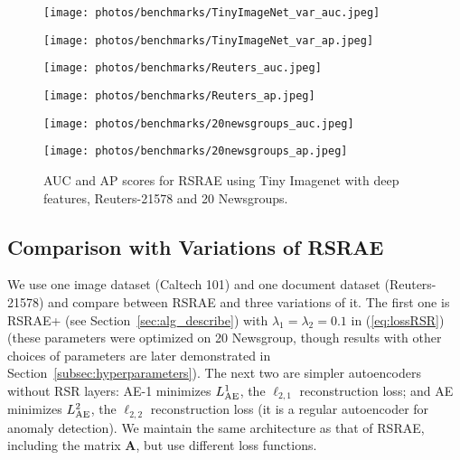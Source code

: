 \documentclass{article} \usepackage{iclr2020_conference,times}
\def\Secref#1{Section~\ref{#1}}
\def\eqref#1{(\ref{#1})}
\def\rmA{{\mathbf{A}}}
\begin{document}
\begin{figure}[htb]


\centering
\begin{minipage}[t]{0.48\textwidth}
\centering
\texttt{[image: photos/benchmarks/TinyImageNet\_var\_auc.jpeg]}
\end{minipage}
\begin{minipage}[t]{0.48\textwidth}
\centering
\texttt{[image: photos/benchmarks/TinyImageNet\_var\_ap.jpeg]}
\end{minipage}


 
\centering
\begin{minipage}[t]{0.48\textwidth}
\centering
\texttt{[image: photos/benchmarks/Reuters\_auc.jpeg]}
\end{minipage}
\begin{minipage}[t]{0.48\textwidth}
\centering
\texttt{[image: photos/benchmarks/Reuters\_ap.jpeg]}
\end{minipage}
 
\centering
\begin{minipage}[t]{0.48\textwidth}
\centering
\texttt{[image: photos/benchmarks/20newsgroups\_auc.jpeg]}
\end{minipage}
\begin{minipage}[t]{0.48\textwidth}
\centering
\texttt{[image: photos/benchmarks/20newsgroups\_ap.jpeg]}
\end{minipage}



\caption{AUC and AP scores for RSRAE using Tiny Imagenet with deep features, Reuters-21578 and 20 Newsgroups.}
\label{fig:aucapall2}
\end{figure}



\subsection{Comparison with Variations of RSRAE}
\label{subsec:cprnorm}

We use one image dataset (Caltech 101) and one document dataset (Reuters-21578) and compare between RSRAE and three variations of it. The first one is RSRAE+ (see \Secref{sec:alg_describe}) with $\lambda_1 = \lambda_2 = 0.1$ in \eqref{eq:lossRSR} (these parameters were optimized on 20 Newsgroup, though results with other choices of parameters are later demonstrated in \Secref{subsec:hyperparameters}). 
The next two are simpler autoencoders without RSR layers: {AE-1}  minimizes $L_{\rm{AE}}^1$, the $\ell_{2,1}$ reconstruction loss;
and {AE} minimizes $L_{\rm{AE}}^2$, the $\ell_{2,2}$ reconstruction loss (it is a regular autoencoder for anomaly detection). We maintain the same architecture as that of RSRAE, including the matrix $\rmA$, but use different loss functions. 
\end{document}
